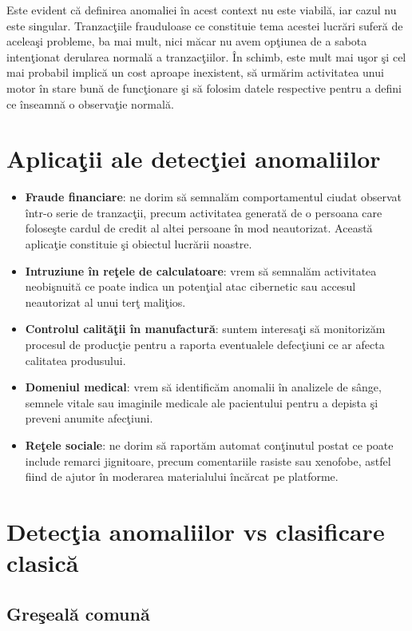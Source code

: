 Este evident că definirea anomaliei în acest context nu este viabilă, iar 
cazul nu este singular. Tranzacţiile frauduloase ce constituie tema acestei lucrări 
suferă de aceleaşi probleme, ba mai mult, nici măcar nu avem opţiunea de a 
sabota intenţionat derularea normală a tranzacţiilor. În schimb, 
este mult mai uşor şi cel mai probabil 
implică un cost aproape inexistent, să urmărim activitatea unui motor 
în stare bună de funcţionare şi să folosim datele respective pentru a 
defini ce înseamnă o observaţie normală.

\section{Aplicaţii ale detecţiei anomaliilor}

\begin{itemize}
    \item \textbf{Fraude financiare}: ne dorim să semnalăm comportamentul ciudat 
    observat într-o serie de tranzacţii, precum activitatea generată de 
    o persoana care foloseşte cardul de credit al altei persoane în mod 
    neautorizat. Această aplicaţie constituie şi obiectul lucrării noastre.
    \item \textbf{Intruziune în reţele de calculatoare}: vrem să semnalăm activitatea
    neobişnuită ce poate indica un potenţial atac cibernetic sau accesul 
    neautorizat al unui terţ maliţios.
    \item \textbf{Controlul calităţii în manufactură}: suntem interesaţi să monitorizăm 
    procesul de producţie pentru a raporta eventualele defecţiuni ce ar afecta 
    calitatea produsului.
    \item \textbf{Domeniul medical}: vrem să identificăm anomalii în analizele de sânge, 
    semnele vitale sau imaginile medicale ale pacientului pentru a depista şi preveni
    anumite afecţiuni.
    \item \textbf{Reţele sociale}: ne dorim să raportăm automat conţinutul postat ce 
    poate include remarci jignitoare, precum comentariile rasiste sau xenofobe,
    astfel fiind de ajutor în moderarea materialului încărcat pe platforme. 
\end{itemize}

\section{Detecţia anomaliilor vs clasificare clasică}

\subsection{Greşeală comună}


